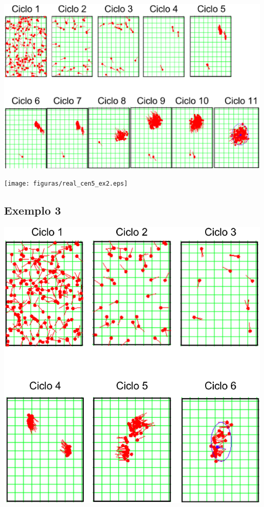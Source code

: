 {\centering
\includegraphics[scale=0.4]{figuras/cen5_ex2.eps}
\label{img:cen5_ex2}
\par}

{\centering
\texttt{[image: figuras/real\_cen5\_ex2.eps]}
\label{img:real_cen5_ex2}
\par}

\subsection{Exemplo 3}

{\centering
\includegraphics[scale=0.4]{figuras/cen5_ex3.eps}
\label{img:cen5_ex3}
\par}


